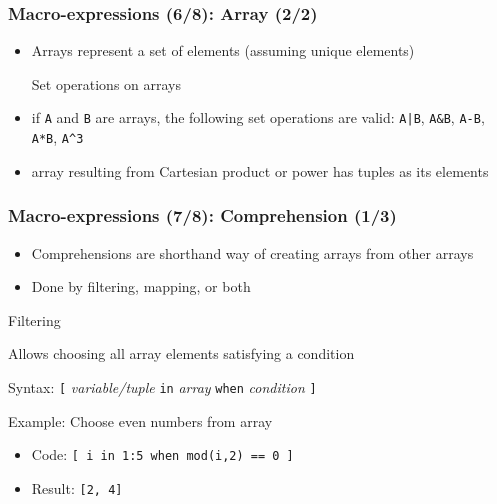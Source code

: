 \documentclass[handout,usepdftitle=false,xcolor=dvipsnames,aspectratio=169]{beamer}
\begin{document}
\begin{frame}[fragile]
  \frametitle{Macro-expressions (6/8): Array (2/2)}
  \begin{itemize}
    \item Arrays represent a set of elements (assuming unique elements)
          \begin{block}{Set operations on arrays}
          \end{block}
    \item if \texttt{A} and \texttt{B} are arrays, the following
          set operations are valid: \texttt{A|B}, \texttt{A\&B}, \texttt{A-B},
          \texttt{A*B}, \texttt{A\^{}3}
    \item array resulting from Cartesian product or power has tuples as its elements
  \end{itemize}
\end{frame}

\begin{frame}[fragile]
  \frametitle{Macro-expressions (7/8): Comprehension (1/3)}
  \begin{itemize}
    \item Comprehensions are shorthand way of creating arrays from other arrays
    \item Done by filtering, mapping, or both
  \end{itemize}
  \begin{block}{Filtering}
    \begin{witemize}
      \item Allows choosing all array elements satisfying a condition
      \item Syntax: \texttt{[} \textit{variable/tuple} \texttt{in} \textit{array} \texttt{when}
      \textit{condition} \texttt{]}
      \item Example: Choose even numbers from array
      \begin{itemize}
        \item Code: \texttt{[ i in 1:5 when mod(i,2) == 0 ]}
        \item Result: \texttt{[2, 4]}
      \end{itemize}
    \end{witemize}
  \end{block}
\end{frame}
\end{document}
